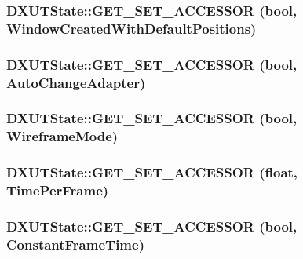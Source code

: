 \label{class_d_x_u_t_state_a00c1bce1dc49ad37f1d7a1d517bfe2c1}
\hypertarget{class_d_x_u_t_state_af8afc1f310b2c7e1a68aa6730c142b6c}{
\subsubsection[{GET\_\-SET\_\-ACCESSOR}]{\setlength{\rightskip}{0pt plus 5cm}DXUTState::GET\_\-SET\_\-ACCESSOR (bool, \/  WindowCreatedWithDefaultPositions)}}
\label{class_d_x_u_t_state_af8afc1f310b2c7e1a68aa6730c142b6c}
\hypertarget{class_d_x_u_t_state_a2bb10450426c21bb4a86a8b979d9afca}{
\subsubsection[{GET\_\-SET\_\-ACCESSOR}]{\setlength{\rightskip}{0pt plus 5cm}DXUTState::GET\_\-SET\_\-ACCESSOR (bool, \/  AutoChangeAdapter)}}
\label{class_d_x_u_t_state_a2bb10450426c21bb4a86a8b979d9afca}
\hypertarget{class_d_x_u_t_state_a59311ccadc02bef1fcce1ee052ceecb9}{
\subsubsection[{GET\_\-SET\_\-ACCESSOR}]{\setlength{\rightskip}{0pt plus 5cm}DXUTState::GET\_\-SET\_\-ACCESSOR (bool, \/  WireframeMode)}}
\label{class_d_x_u_t_state_a59311ccadc02bef1fcce1ee052ceecb9}
\hypertarget{class_d_x_u_t_state_a2cf24d275f714d043aa07c7f84f057fe}{
\subsubsection[{GET\_\-SET\_\-ACCESSOR}]{\setlength{\rightskip}{0pt plus 5cm}DXUTState::GET\_\-SET\_\-ACCESSOR (float, \/  TimePerFrame)}}
\label{class_d_x_u_t_state_a2cf24d275f714d043aa07c7f84f057fe}
\hypertarget{class_d_x_u_t_state_a467c802afbcd8e51a8ccf569107eed64}{
\subsubsection[{GET\_\-SET\_\-ACCESSOR}]{\setlength{\rightskip}{0pt plus 5cm}DXUTState::GET\_\-SET\_\-ACCESSOR (bool, \/  ConstantFrameTime)}}
